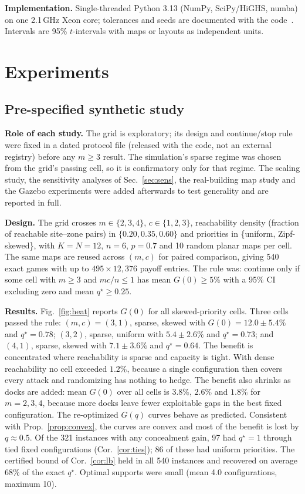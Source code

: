 \documentclass[letterpaper,journal]{IEEEtran}
\theoremstyle{remark}
\begin{document}
\textbf{Implementation.} Single-threaded Python 3.13 (NumPy, SciPy/HiGHS, numba) on one 2.1\,GHz Xeon core; tolerances and seeds are documented with the code~\cite{alam2026code}. Intervals are 95\% $t$-intervals with maps or layouts as independent units.

\section{Experiments}\label{sec:exp}
\subsection{Pre-specified synthetic study}
\textbf{Role of each study.} The grid is exploratory; its design and continue/stop rule were fixed in a dated protocol file (released with the code, not an external registry) before any $m\ge3$ result. The simulation's sparse regime was chosen from the grid's passing cell, so it is confirmatory only for that regime. The scaling study, the sensitivity analyses of Sec.~\ref{sec:sens}, the real-building map study and the Gazebo experiments were added afterwards to test generality and are reported in full.

\textbf{Design.} The grid crosses $m\in\{2,3,4\}$, $c\in\{1,2,3\}$, reachability density (fraction of reachable site--zone pairs) in $\{0.20,0.35,0.60\}$ and priorities in \{uniform, Zipf-skewed\}, with $K=N=12$, $n=6$, $p=0.7$ and 10 random planar maps per cell. The same maps are reused across $(m,c)$ for paired comparison, giving 540 exact games with up to $495\times12{,}376$ payoff entries. The rule was: continue only if some cell with $m\ge3$ and $mc/n\le1$ has mean $G(0)\ge5\%$ with a 95\% CI excluding zero and mean $q^\star\ge0.25$.

\textbf{Results.} Fig.~\ref{fig:heat} reports $G(0)$ for all skewed-priority cells. Three cells passed the rule: $(m,c)=(3,1)$, sparse, skewed with $G(0)=12.0\pm5.4\%$ and $q^\star=0.78$; $(3,2)$, sparse, uniform with $5.4\pm2.6\%$ and $q^\star=0.73$; and $(4,1)$, sparse, skewed with $7.1\pm3.6\%$ and $q^\star=0.64$. The benefit is concentrated where reachability is sparse and capacity is tight. With dense reachability no cell exceeded $1.2\%$, because a single configuration then covers every attack and randomizing has nothing to hedge. The benefit also shrinks as docks are added: mean $G(0)$ over all cells is $3.8\%$, $2.6\%$ and $1.8\%$ for $m=2,3,4$, because more docks leave fewer exploitable gaps in the best fixed configuration. The re-optimized $G(q)$ curves behave as predicted. Consistent with Prop.~\ref{prop:convex}, the curves are convex and most of the benefit is lost by $q\approx0.5$. Of the 321 instances with any concealment gain, 97 had $q^\star=1$ through tied fixed configurations (Cor.~\ref{cor:ties}); 86 of these had uniform priorities. The certified bound of Cor.~\ref{cor:lb} held in all 540 instances and recovered on average 68\% of the exact $q^\star$. Optimal supports were small (mean 4.0 configurations, maximum 10).
\end{document}
